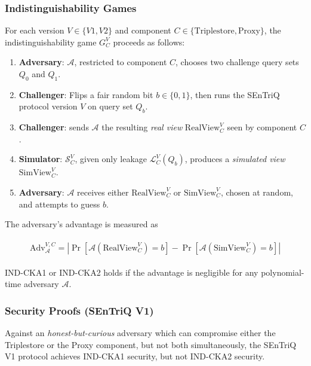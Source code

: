 \subsubsection{Indistinguishability Games}

For each version $V \in \{V1,V2\}$ and component $C \in \{\mathrm{Triplestore}, \mathrm{Proxy}\}$, the indistinguishability game $G^V_C$ proceeds as follows:

\begin{enumerate}
    \item \textbf{Adversary}: $\mathcal{A}$, restricted to component $C$, chooses two challenge query sets $Q_0$ and $Q_1$.
    \item \textbf{Challenger}: Flips a fair random bit $b \in \{0,1\}$, then runs the \gls{SEnTriQ} protocol version $V$ on query set $Q_b$.
    \item \textbf{Challenger}: sends $\mathcal{A}$ the resulting \emph{real view} $\mathrm{RealView}_C^{V}$ seen by component $C$.
    \item \textbf{Simulator}: $\mathcal{S}_C^{V}$, given only leakage $\mathcal{L}_C^{V}(Q_b)$, produces a \emph{simulated view} $\mathrm{SimView}_C^{V}$.
    \item \textbf{Adversary}: $\mathcal{A}$ receives either $\mathrm{RealView}_C^{V}$ or $\mathrm{SimView}_C^{V}$, chosen at random, and attempts to guess $b$.
\end{enumerate}

The adversary's advantage is measured as

\begin{align}
    \label{equation:adversary-advantage}
    \begin{split}
        \mathrm{Adv}_{\mathcal{A}}^{V,C} = \left| \Pr[ \mathcal{A}(\mathrm{RealView}_C^{V})=b ] - \Pr[ \mathcal{A}(\mathrm{SimView}_C^{V})=b ] \right|
    \end{split}
\end{align}


IND-CKA1 or IND-CKA2 holds if the advantage is negligible for any polynomial-time adversary $\mathcal{A}$.


\subsubsection{Security Proofs (SEnTriQ V1)}

\begin{theorem} 
    Against an \emph{honest-but-curious} adversary which can compromise either the Triplestore or the Proxy component, but not both simultaneously, the \gls{SEnTriQ} V1 protocol achieves \gls{IND-CKA1} security, but not \gls{IND-CKA2} security.
\end{theorem}

